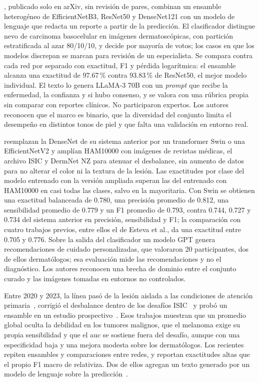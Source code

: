 \textcite{khan2025ensemble}, publicado solo en arXiv, sin revisión de pares, combinan un ensamble heterogéneo de
EfficientNetB3, ResNet50 y DenseNet121 con un modelo de lenguaje que redacta un reporte a partir de la predicción. El
clasificador distingue nevo de carcinoma basocelular en imágenes dermatoscópicas, con partición estratificada al azar
80/10/10, y decide por mayoría de votos; los casos en que los modelos discrepan se marcan para revisión de un
especialista. Se compara contra cada red por separado con exactitud, F1 y pérdida logarítmica: el ensamble alcanza una
exactitud de 97.67\,\% contra 93.83\,\% de ResNet50, el mejor modelo individual. El texto lo genera LLaMA-3 70B con un
\emph{prompt} que recibe la enfermedad, la confianza y si hubo consenso, y se valora con una rúbrica propia sin
comparar con reportes clínicos. No participaron expertos. Los autores reconocen que el marco es binario, que la
diversidad del conjunto limita el desempeño en distintos tonos de piel y que falta una validación en entorno real.

\textcite{kim2025skinsavvy2} reemplazan la DenseNet de su sistema anterior por un transformer Swin o una EfficientNetV2
y amplían HAM10000 con imágenes de revistas médicas, el archivo ISIC y DermNet NZ para atenuar el desbalance, sin
aumento de datos para no alterar el color ni la textura de la lesión. Las exactitudes por clase del modelo entrenado con
la versión ampliada superan las del entrenado con HAM10000 en casi todas las clases, salvo en la mayoritaria. Con Swin
se obtienen una exactitud balanceada de 0.780, una precisión promedio de 0.812, una sensibilidad promedio de 0.779 y un F1
promedio de 0.793, contra 0.744, 0.727 y 0.734 del sistema anterior en precisión, sensibilidad y F1; la
comparación con cuatro trabajos previos, entre ellos el de Esteva et al., da una exactitud entre 0.705 y 0.776.
Sobre la salida del clasificador un modelo GPT genera recomendaciones de cuidado personalizadas, que valoraron 20
participantes, dos de ellos dermatólogos; esa evaluación mide las recomendaciones y no el diagnóstico. Los autores
reconocen una brecha de dominio entre el conjunto curado y las imágenes tomadas en entornos no controlados.

Entre 2020 y 2023, la línea pasó de la lesión aislada a las condiciones de atención
primaria~\cite{liu2020deep}, corrigió el desbalance dentro de los desafíos ISIC~\cite{gessert2020skin,yao2022single}
y probó un ensamble en un estudio prospectivo~\cite{marchetti2023prospective}. Esos trabajos muestran que un
promedio global oculta la debilidad en los tumores malignos, que el melanoma exige su propia sensibilidad y que el
\gls{auc} se sostiene fuera del desafío, aunque con una especificidad baja y una mejora modesta sobre los
dermatólogos. Los recientes repiten ensambles y comparaciones entre redes, y
reportan exactitudes altas que el propio F1 macro de \textcite{aboulmira2024skinhealthmate} relativiza. Dos de ellos
agregan un texto generado por un modelo de lenguaje sobre la predicción~\cite{khan2025ensemble,kim2025skinsavvy2}.


